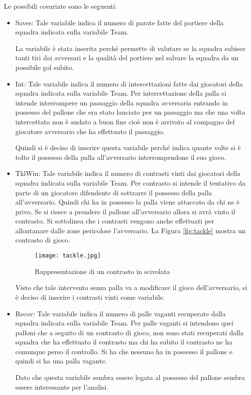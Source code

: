 Le possibili covariate sono le seguenti:
\begin{itemize}
	
	\item \textsf{Saves}: Tale variabile indica il numero di parate fatte del portiere della squadra indicata sulla variabile \textsf{Team}. 
	
	La variabile è stata inserita perché permette di valutare se la squadra subisce tanti tiri dai avversari e la qualità del portiere nel salvare la squadra da un possibile gol subito.
	
	\item \textsf{Int}: Tale variabile indica il numero di intercettazioni fatte dai giocatori della squadra indicata sulla variabile \textsf{Team}. Per intercettazione della palla si intende interrompere un passaggio della squadra avversaria entrando in possesso del pallone che era stato lanciato per un passaggio ma che una volta intercettato non è andato a buon fine cioè non è arrivato al compagno del giocatore avversario che ha effettuato il passaggio. 
	
	Quindi si è deciso di inserire questa variabile perché indica quante volte si è tolto il possesso della palla all'avversario interrompendone il suo gioco.
	\item \textsf{TklWin}: Tale variabile indica il numero di contrasti vinti dai giocatori della squadra indicata sulla variabile \textsf{Team}. Per contrasto si intende il tentativo da parte di un giocatore difendente di sottrarre il possesso della palla all'avversario. Quindi chi ha in possesso la palla viene attaccato da chi ne è privo. Se si riesce a prendere il pallone all'avversario allora si avrà vinto il contrasto. Si sottolinea che i contrasti vengono anche effettuati per allontanare dalle zone pericolose l'avversario. La Figura \ref{fig:tackle} mostra un contrasto di gioco.
	
	\begin{figure}[!ht]
		\begin{center}
			\texttt{[image: tackle.jpg]}
			\caption{Rappresentazione di un contrasto in scivolata}
		\end{center}
	\end{figure}
	
	Visto che tale intervento senza palla va a modificare il gioco dell'avversario, si è deciso di inserire i contrasti vinti come variabile. 
	
	\item \textsf{Recov}: Tale variabile indica il numero di palle vaganti recuperate dalla squadra indicata sulla variabile \textsf{Team}. Per palle vaganti si intendono quei palloni che a seguito di un contrasto di gioco, non sono stati recuperati dalla squadra che ha effettuato il contrasto ma chi ha subito il contrasto ne ha comunque perso il controllo. Si ha che nessuno ha in possesso il pallone e quindi si ha una palla vagante.
	
	Dato che questa variabile sembra essere legata al possesso del pallone sembra essere interessante per l'analisi.
	
\end{itemize}
